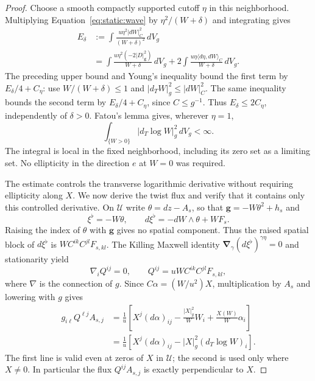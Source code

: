 \begin{proof}
Choose a smooth compactly supported cutoff $\eta$ in this
neighborhood. Multiplying Equation~\eqref{eq:static:wave} by
$\eta^2/(W+\delta)$ and integrating gives
\begin{align*}
 E_\delta
 &:={\int}\frac{u\eta^2|dW|_C^2}{(W+\delta)^2}\,dV_g\\
 &=\int\frac{u\eta^2(-2|D|_{\mathbf g}^2)}{W+\delta}\,dV_g
   +2\int\frac{u\eta\langle d\eta,dW\rangle_C}{W+\delta}\,dV_g.
\end{align*}
The preceding upper bound and Young's inequality bound the first
term by $E_\delta/4+C_\eta$: use $W/(W+\delta)\leq1$ and
$|d_TW|_g^2\leq |dW|_C^2$. The same inequality bounds the second
term by $E_\delta/4+C_\eta$, since $C\leq g^{-1}$.
Thus $E_\delta\leq 2C_\eta$, independently of $\delta>0$.
Fatou's lemma gives, wherever $\eta=1$,
\begin{equation}\label{eq:static:log-bound}
 \int_{\{W>0\}} |d_T\log W|_g^2\,dV_g<\infty.
\end{equation}
The integral is local in the fixed neighborhood, including its zero
set as a limiting set. No ellipticity in the direction $e$ at
$W=0$ was required.

The estimate controls the transverse logarithmic derivative without
requiring ellipticity along $X$.  We now derive the twist flux and verify
that it contains only this controlled derivative.  On $\mathcal U$ write $\theta=dz-A_s$, so that
$\mathbf g=-W\theta^2+h_s$ and
\[
 \xi^\flat=-W\theta,\qquad
 d\xi^\flat=-dW\wedge\theta+WF_s.
\]
Raising the index of $\theta$ with $\mathbf g$ gives no spatial
component. Thus the raised spatial block of $d\xi^\flat$ is
$WC^{ik}C^{jl}F_{s,kl}$. The Killing Maxwell identity
$\boldsymbol\nabla_\gamma(d\xi^\flat)^{\gamma\eta}=0$
and stationarity yield
\begin{equation}\label{eq:static:Maxwell}
 \nabla_iQ^{ij}=0,\qquad
 Q^{ij}=uW C^{ik}C^{jl}F_{s,kl},
\end{equation}
where $\nabla$ is the connection of $g$.
Since $C\alpha=(W/u^2)X$, multiplication by $A_s$ and lowering
with $g$ gives
\begin{equation}\label{eq:static:twist-flux}
 \begin{split}
 g_{i\ell}Q^{\ell j}A_{s,j}
 &=\frac1u\left[
 X^j(d\alpha)_{ij}-\frac{|X|_g^2}{W}W_i
       +\frac{X(W)}{W}\alpha_i\right]\\
 &=\frac1u\left[X^j(d\alpha)_{ij}
           -|X|_g^2(d_T\log W)_i\right].
 \end{split}
\end{equation}
The first line is valid even at zeros of $X$ in $\mathcal U$;
the second is used only where $X\ne0$. In particular the flux
$Q^{ij}A_{s,j}$ is exactly perpendicular to $X$.


\end{proof}
